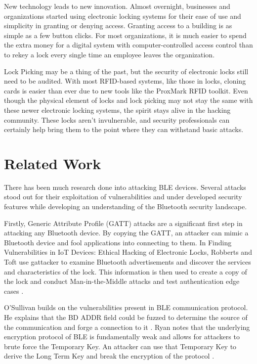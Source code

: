 \documentclass[10pt,twocolumn,letterpaper]{article}
\begin{document}
New technology leads to new innovation.  Almost overnight, businesses and organizations started using electronic locking systems for their ease of use and simplicity in granting or denying access.  Granting access to a building is as simple as a few button clicks.  For most organizations, it is much easier to spend the extra money for a digital system with computer-controlled access control than to rekey a lock every single time an employee leaves the organization.

Lock Picking may be a thing of the past, but the security of electronic locks still need to be audited.  With most RFID-based systems, like those in locks, cloning cards is easier than ever due to new tools like the ProxMark RFID toolkit.\cite{7945583}  Even though the physical element of locks and lock picking may not stay the same with these newer electronic locking systems, the spirit stays alive in the hacking community.  These locks aren't invulnerable, and security professionals can certainly help bring them to the point where they can withstand basic attacks.


\section{Related Work}
There has been much research done into attacking BLE devices. Several attacks stood out for their exploitation of vulnerabilities and under developed security features while developing an understanding of the Bluetooth security landscape.

Firstly, Generic Attribute Profile (GATT) attacks are a significant first step in attacking any Bluetooth device. By copying the GATT, an attacker can mimic a Bluetooth device and fool applications into connecting to them. In Finding Vulnerabilities in IoT Devices: Ethical Hacking of Electronic Locks, Robberts and Toft use gattacker to examine Bluetooth advertisements and discover the services and characteristics of the lock. This information is then used to create a copy of the lock and conduct Man-in-the-Middle attacks and test authentication edge cases \cite{KTH}.

O'Sullivan builds on the vulnerabilities present in BLE communication protocol. He explains that the BD ADDR field could be fuzzed to determine the source of the communication and forge a connection to it \cite{osullivan}. Ryan notes that the underlying encryption protocol of BLE is fundamentally weak and allows for attackers to brute force the Temporary Key. An attacker can use that Temporary Key to derive the Long Term Key and break the encryption of the protocol \cite{mryan13}.
\end{document}
